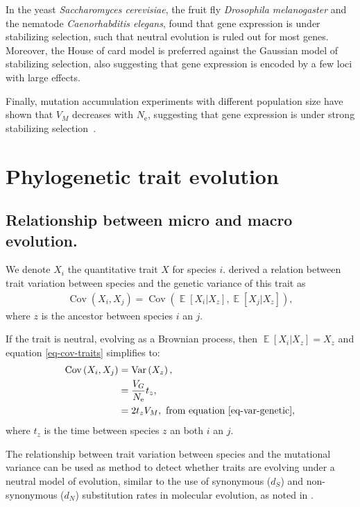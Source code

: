 \documentclass{article}
\DeclareMathOperator{\E}{\mathbb{E}}
\DeclareMathOperator{\Var}{\text{Var}}
\DeclareMathOperator{\Cov}{\text{Cov}}
\newcommand{\Ne}{N_{\text{e}}}
\newcommand{\dn}{d_N}
\newcommand{\ds}{d_S}
\newcommand{\VarGenetic}{V_{G}}
\newcommand{\VarMutation}{V_{M}}
\newcommand{\Trait}{X}
\begin{document}
In the yeast \textit{Saccharomyces cerevisiae}, the fruit fly \textit{Drosophila melanogaster} and the nematode \textit{Caenorhabditis elegans},  \citet{hodgins-davis_gene_2015} found that gene expression is under stabilizing selection, such that neutral evolution is ruled out for most genes.
Moreover, the House of card model is preferred against the Gaussian model of stabilizing selection, also suggesting that gene expression is encoded by a few loci with large effects.

Finally, mutation accumulation experiments with different population size have shown that $\VarMutation$ decreases with $\Ne$, suggesting that gene expression is under strong stabilizing selection~\citep{deiss_global_2021}.

\section{Phylogenetic trait evolution}

\subsection{Relationship between micro and macro evolution. }

We denote $\Trait_i$ the quantitative trait $\Trait$ for species $i$.
\citet{hansen_translating_1996} derived a relation between trait variation between species and the genetic variance of this trait as 
\begin{gather}
    \Cov \left( \Trait_i, \Trait_j \right) = \Cov \left( \E \left[ \Trait_i | \Trait_z \right ], \E \left[ \Trait_j | \Trait_z \right ] \right),  \label{eq-cov-traits}
\end{gather}
where $z$ is the ancestor between species $i$ an $j$.

If the trait is neutral, evolving as a Brownian process, then $\E \left[ \Trait_i | \Trait_z \right ] = \Trait_z$ and equation \ref{eq-cov-traits} simplifies to:
\begin{align}
\Cov \left( \Trait_i, \Trait_j \right) &= \Var \left( \Trait_z \right),\\
    &= \frac{\VarGenetic}{\Ne} t_{z}, \\
    &=  2 t_{z} \VarMutation, \label{eq-cov-traits-neutral} \text{ from equation } \ref{eq-var-genetic},
\end{align}
where $t_{z}$ is the time between species $z$ an both $i$ an $j$.

The relationship between trait variation between species and the mutational variance can be used as method to detect whether traits are evolving under a neutral model of evolution, similar to the use of synonymous ($\ds$) and non-synonymous ($\dn$) substitution rates in molecular evolution, as noted in \citet{fay_evaluating_2008}.
\end{document}
